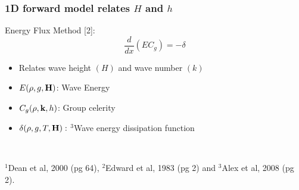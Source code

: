 \documentclass[7pt]{beamer}
\begin{document}
\begin{frame}
	\frametitle{1D forward model relates $H$ and $h$}
	Energy Flux Method [2]:
	$$\frac{d}{dx}\left(EC_g\right)=-\delta $$
	\begin{itemize}
	    \item Relates wave height $(H)$ and wave number $(k)$
		\item $E(\rho,g,{\bf H})$: Wave Energy
		\item  $C_{g}(\rho,{\bf k},h)$: Group celerity
		\item $\delta(\rho,g,T,{\bf H}):$ $^3$Wave energy dissipation function
	\end{itemize}
	$\quad$\\
	\begin{flushright}
	{\tiny $^1$Dean et al, 2000 (pg 64), $^2$Edward et al, 1983 (pg 2) and $^3$Alex et al, 2008 (pg 2)}.
	\end{flushright}
\end{frame}
\end{document}
